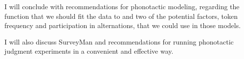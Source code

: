 I will conclude with recommendations for phonotactic modeling, regarding the
function that we should fit the data to and two of the potential factors, token
frequency and participation in alternations, that we could use in those models.

I will also discuss SurveyMan and recommendations for running phonotactic
judgment experiments in a convenient and effective way.


